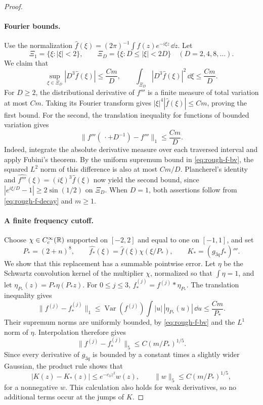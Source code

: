 \begin{proof}
\paragraph{Fourier bounds.}
Use the normalization
$\widehat f(\xi)=(2\pi)^{-1}\int f(z)e^{-i\xi z}\,\dd z$.
Let
\[
 \Xi_1=\{\xi:|\xi|<2\},\qquad
 \Xi_D=\{\xi:D\le|\xi|<2D\}
 \quad(D=2,4,8,\ldots).
\]
We claim that
\begin{equation}
 \sup_{\xi\in\Xi_D}|D^3\widehat f(\xi)|\le\frac{Cm}{D},
 \qquad
 \int_{\Xi_D}|D^3\widehat f(\xi)|^2\,\dd\xi
 \le\frac{Cm}{D}.
 \label{eq:rough-fourier-bounds}
\end{equation}
For $D\ge2$, the distributional derivative of $f'''$ is a finite
measure of total variation at most $Cm$.  Taking its Fourier transform
gives $|\xi|^4|\widehat f(\xi)|\le Cm$, proving the first bound.
For the second, the translation inequality for functions of bounded
variation gives
\[
 \|f'''(\,\cdot+D^{-1})-f'''\|_1\le\frac{Cm}{D}.
\]
Indeed, integrate the absolute derivative measure over each traversed
interval and apply Fubini's theorem.  By the uniform supremum bound
in \eqref{eq:rough-f-bv}, the squared $L^2$ norm of this difference is
also at most $Cm/D$.  Plancherel's identity and
$\widehat{f'''}(\xi)=(i\xi)^3\widehat f(\xi)$ now yield the second
bound, since $|e^{i\xi/D}-1|\ge2\sin(1/2)$ on $\Xi_D$.
When $D=1$, both assertions follow from
\eqref{eq:rough-f-decay} and $m\ge1$.

\paragraph{A finite frequency cutoff.}
Choose $\chi\in C_c^\infty(\mathbb R)$ supported on $[-2,2]$ and equal to one
on $[-1,1]$, and set
\[
 P_*=(2+n)^8,\qquad
 \widehat{f_*}(\xi)=\widehat f(\xi)\chi(\xi/P_*),\qquad
 K_*=(g_{3q}f_*)'''.
\]
We show that this replacement has a summable pointwise error.
Let $\eta$ be the Schwartz convolution kernel of the multiplier
$\chi$, normalized so that $\int\eta=1$, and let
$\eta_{P_*}(z)=P_*\eta(P_*z)$.  For $0\le j\le3$,
$f_*^{(j)}=f^{(j)}*\eta_{P_*}$.  The translation inequality gives
\[
 \|f^{(j)}-f_*^{(j)}\|_1
 \le\operatorname{Var}(f^{(j)})
      \int |u|\,|\eta_{P_*}(u)|\,\dd u
 \le\frac{Cm}{P_*}.
\]
Their supremum norms are uniformly bounded, by
\eqref{eq:rough-f-bv} and the $L^1$ norm of $\eta$.  Interpolation
therefore gives
\[
 \|f^{(j)}-f_*^{(j)}\|_5
 \le C(m/P_*)^{1/5}.
\]
Since every derivative of $g_{3q}$ is bounded by a constant times a
slightly wider Gaussian, the product rule shows that
\begin{equation}
 |K(z)-K_*(z)|\le e^{-c_3z^2}w(z),
 \qquad \|w\|_5\le C(m/P_*)^{1/5},
 \label{eq:rough-cutoff-error}
\end{equation}
for a nonnegative $w$.  This calculation also holds for weak
derivatives, so no additional terms occur at the jumps of $K$.


\end{proof}
